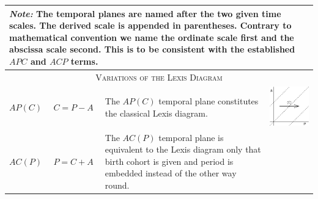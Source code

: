 \documentclass[
  12pt
]{scrartcl}
\begin{document}
\begin{center}
  \small
  \begin{longtable}{m{}m{}m{}m{}}
  \toprule
  \multicolumn{4}{m{0.9\textwidth}}{\footnotesize\emph{Note:} The temporal planes are named after the two given time scales. The derived scale is appended in parentheses. Contrary to mathematical convention we name the ordinate scale first and the abscissa scale second. This is to be consistent with the established $APC$ and $ACP$ terms.} \\
  \midrule
  \multicolumn{4}{c}{\textsc{Variations of the Lexis Diagram}} \\
  \midrule
  $AP(C)$ & $C = P - A$ &
  The $AP(C)$ temporal plane constitutes the classical Lexis diagram. &
  \includegraphics[width = \linewidth]{../fig/APc.pdf} \\
  \midrule
  $AC(P)$ & $P = C + A$ &
  The $AC(P)$ temporal plane is equivalent to the Lexis diagram only that birth cohort is given and period is embedded instead of the other way round. &

\end{longtable}
\end{center}
\end{document}
